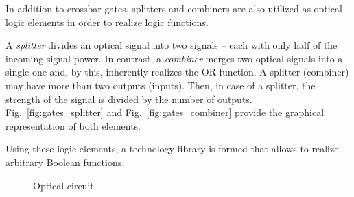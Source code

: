 \documentclass[10pt,letterpaper,twoside,openright]{book}
\begin{document}
In addition to crossbar gates, splitters and combiners are also utilized as optical logic elements in order to realize logic functions.


\begin{definition}
A \emph{splitter} divides an optical signal into two signals -- each with only half of the incoming
signal power.  In contrast, a \emph{combiner} merges two optical signals into a single one and, by
this, inherently realizes the OR-function. A splitter (combiner) may have more than two outputs
(inputs). Then, in case of a splitter, the strength of the signal is divided by the number of
outputs.
Fig.~\ref{fig:gates_splitter} and Fig.~\ref{fig:gates_combiner} provide the graphical representation of
both elements.
\end{definition}

Using these logic elements, a technology library is formed that allows to realize arbitrary
Boolean functions.

\begin{figure}
\centering
{}
\caption{Optical circuit}
\label{fig:circuit}
\end{figure}
\end{document}
